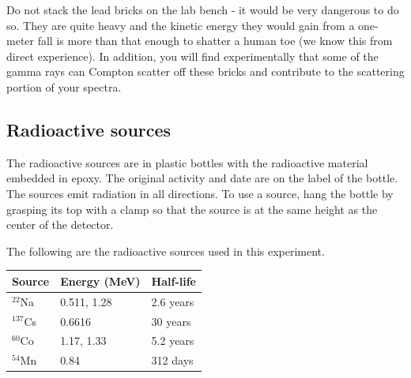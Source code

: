 \documentclass{../lab}
\begin{document}
Do not stack the lead bricks on the lab bench - it would be very dangerous to do so. They are quite heavy and the kinetic energy they would gain from a one-meter fall is more than that enough to shatter a human toe (we know this from direct experience). In addition, you will find experimentally that some of the gamma rays can Compton scatter off these bricks and contribute to the scattering portion of your spectra.

\subsection{Radioactive sources}

The radioactive sources are in plastic bottles with the radioactive material embedded in epoxy. The original activity and date are on the label of the bottle. The sources emit radiation in all directions. To use a source, hang the bottle by grasping its top with a clamp so that the source is at the same height as the center of the detector.

The following are the radioactive sources used in this experiment.

\begin{center}
    \begin{tabular}{l|l|l}
        Source     & Energy (MeV) & Half-life \\\hline
        $^{22}$Na  &  0.511, 1.28 & 2.6 years \\\hline
        $^{137}$Cs &  0.6616      & 30 years  \\\hline
        $^{60}$Co  &  1.17, 1.33  & 5.2 years \\\hline
        $^{54}$Mn  &  0.84        & 312 days
    \end{tabular}
\end{center}
\end{document}
